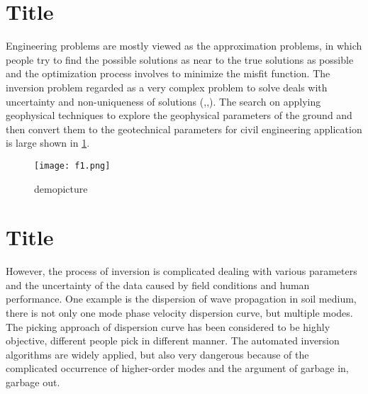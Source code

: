 \section{Title}
Engineering problems are mostly viewed as the approximation problems, in which people try to find the possible solutions as near to the true solutions as possible and the optimization process involves to minimize the misfit function. The inversion problem regarded as a very complex problem to solve deals with uncertainty and non-uniqueness of solutions (\cite{park1999higher},\cite{park2007multichannel},\cite{park2008roadside}). The search on applying geophysical techniques to explore the geophysical parameters of the ground and then convert them to the geotechnical parameters for civil engineering application is large shown in \ref{fig:wave}. 

\begin{figure}[h]
    \centering
    \texttt{[image: f1.png]}
    \caption{demopicture}
    \label{fig:wave}
\end{figure}

\section{Title}
However, the process of inversion is complicated dealing with various parameters and the uncertainty of the data caused by field conditions and human performance. One example is the dispersion of wave propagation in soil medium, there is not only one mode phase velocity dispersion curve, but multiple modes. The picking approach of dispersion curve has been considered to be highly objective, different people pick in different manner. The automated inversion algorithms are widely applied, but also very dangerous because of the complicated occurrence of higher-order modes and the argument of garbage in, garbage out.


